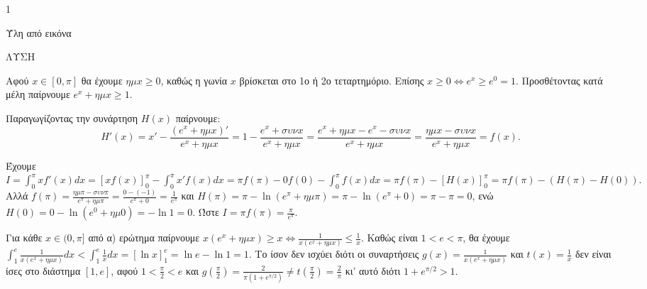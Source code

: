 \begin{ylh}{1}
    \item [Ύλη από εικόνα]
\end{ylh}
ΛΥΣΗ
\begin{alist}
    \item Αφού $x \in [0,\pi]$ θα έχουμε $\eta\mu x \ge 0$, καθώς η γωνία $x$ βρίσκεται στο 1ο ή 2ο τεταρτημόριο.
    Επίσης $x \ge 0 \Leftrightarrow e^x \ge e^0 = 1$.
    Προσθέτοντας κατά μέλη παίρνουμε $e^x + \eta\mu x \ge 1$.
    \item Παραγωγίζοντας την συνάρτηση $H(x)$ παίρνουμε:
    \[H'(x) = x' - \frac{(e^x+\eta\mu x)'}{e^x+\eta\mu x} = 1 - \frac{e^x+\sigma\upsilon\nu x}{e^x+\eta\mu x} = \frac{e^x+\eta\mu x - e^x-\sigma\upsilon\nu x}{e^x+\eta\mu x} = \frac{\eta\mu x-\sigma\upsilon\nu x}{e^x+\eta\mu x} = f(x).\]
    \item Έχουμε $I = \int_0^\pi xf'(x)dx = [xf(x)]_0^\pi - \int_0^\pi x'f(x)dx = \pi f(\pi) - 0f(0) - \int_0^\pi f(x)dx = \pi f(\pi) - [H(x)]_0^\pi = \pi f(\pi) - (H(\pi) - H(0)).$
    Αλλά $f(\pi) = \frac{\eta\mu\pi-\sigma\upsilon\nu\pi}{e^\pi+\eta\mu\pi} = \frac{0-(-1)}{e^\pi+0} = \frac{1}{e^\pi}$ και $H(\pi) = \pi - \ln(e^\pi + \eta\mu\pi) = \pi - \ln(e^\pi + 0) = \pi - \pi = 0$, ενώ
    $H(0) = 0 - \ln(e^0 + \eta\mu 0) = -\ln 1 = 0$.
    Ώστε $I = \pi f(\pi) = \frac{\pi}{e^\pi}$.
    \item Για κάθε $x \in (0,\pi]$ από α) ερώτημα παίρνουμε $x(e^x + \eta\mu x) \ge x \Leftrightarrow \frac{1}{x(e^x+\eta\mu x)} \le \frac{1}{x}$.
    Καθώς είναι $1 < e < \pi$, θα έχουμε $\int_1^e \frac{1}{x(e^x+\eta\mu x)}dx < \int_1^e \frac{1}{x}dx = [\ln x]_1^e = \ln e - \ln 1 = 1$.
    Το ίσον δεν ισχύει διότι οι συναρτήσεις $g(x) = \frac{1}{x(e^x+\eta\mu x)}$ και $t(x) = \frac{1}{x}$ δεν είναι ίσες στο διάστημα $[1,e]$, αφού $1 < \frac{\pi}{2} < e$ και $g\left(\frac{\pi}{2}\right) = \frac{2}{\pi(1+e^{\pi/2})} \ne t\left(\frac{\pi}{2}\right) = \frac{2}{\pi}$ κι' αυτό διότι $1+e^{\pi/2} > 1$.
\end{alist}